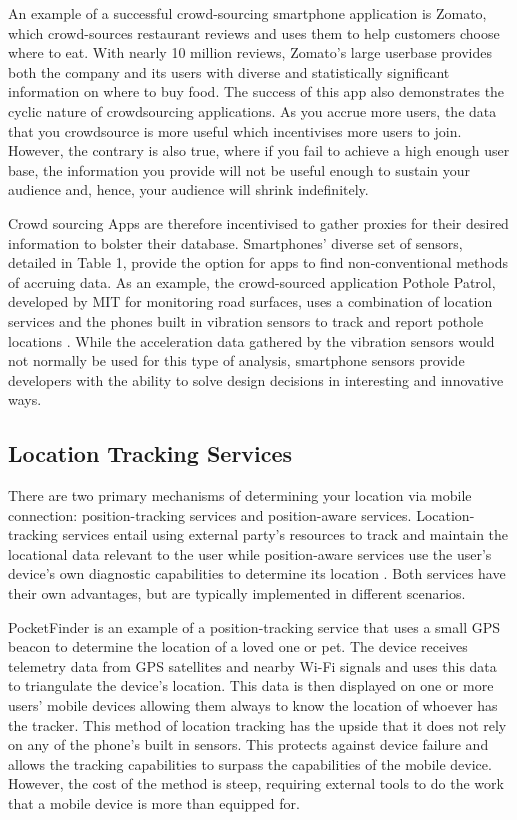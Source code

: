 An example of a successful crowd-sourcing smartphone application is Zomato, which crowd-sources restaurant reviews and uses them to help customers choose where to eat. With nearly 10 million reviews, Zomato’s large userbase provides both the company and its users with diverse and statistically significant information on where to buy food. The success of this app also demonstrates the cyclic nature of crowdsourcing applications. As you accrue more users, the data that you crowdsource is more useful which incentivises more users to join. However, the contrary is also true, where if you fail to achieve a high enough user base, the information you provide will not be useful enough to sustain your audience and, hence, your audience will shrink indefinitely.

Crowd sourcing Apps are therefore incentivised to gather proxies for their desired information to bolster their database. Smartphones’ diverse set of sensors, detailed in Table 1, provide the option for apps to find non-conventional methods of accruing data. As an example, the crowd-sourced application Pothole Patrol, developed by MIT for monitoring road surfaces, uses a combination of location services and the phones built in vibration sensors to track and report pothole locations \cite{eriksson2008pothole}. While the acceleration data gathered by the vibration sensors would not normally be used for this type of analysis, smartphone sensors provide developers with the ability to solve design decisions in interesting and innovative ways. 

\subsection{Location Tracking Services}
There are two primary mechanisms of determining your location via mobile connection: position-tracking services and position-aware services. Location-tracking services entail using external party’s resources to track and maintain the locational data relevant to the user while position-aware services use the user’s device’s own diagnostic capabilities to determine its location \cite{Barkhuus2003}. Both services have their own advantages, but are typically implemented in different scenarios. 

PocketFinder is an example of a position-tracking service that uses a small GPS beacon to determine the location of a loved one or pet. The device receives telemetry data from GPS satellites and nearby Wi-Fi signals and uses this data to triangulate the device’s location. This data is then displayed on one or more users’ mobile devices allowing them always to know the location of whoever has the tracker. This method of location tracking has the upside that it does not rely on any of the phone’s built in sensors. This protects against device failure and allows the tracking capabilities to surpass the capabilities of the mobile device. However, the cost of the method is steep, requiring external tools to do the work that a mobile device is more than equipped for.

